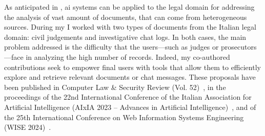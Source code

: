

As anticipated in , \ac{ai} systems can be applied to the legal domain for addressing the analysis of vast amount of documents, that can come from heterogeneous sources.
During my \phd I worked with two types of documents from the Italian legal domain: civil judgements and investigative chat logs. In both cases, the main problem addressed is the difficulty that the users---such as judges or prosecutors---face in analyzing the high number of records. Indeed, my co-authored contributions seek to empower final users with tools that allow them to efficiently explore and retrieve relevant documents or chat messages.
These proposals have been published in Computer Law \& Security Review (Vol. 52)~\cite{BELLANDI2024}, in the proceedings of the 22nd International Conference of the Italian Association for Artificial Intelligence (AIxIA 2023 -- Advances in Artificial Intelligence)~\cite{aixia_2023}, and of the 25th International Conference on Web Information Systems Engineering (WISE 2024)~\cite{pozzi_wise_2025}.

